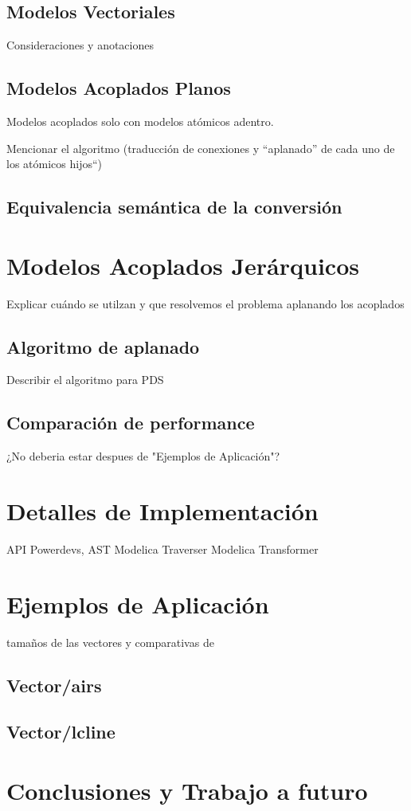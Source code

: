 \documentclass[a4paper,	11pt]{article}
\begin{document}
\subsection{Modelos Vectoriales}
Consideraciones  y anotaciones

\subsection{Modelos Acoplados Planos}
Modelos acoplados solo con modelos atómicos adentro.

Mencionar el algoritmo (traducción de conexiones y ``aplanado'' de cada uno de los atómicos hijos``)	

\subsection{Equivalencia semántica de la conversión}

\section{Modelos Acoplados Jerárquicos}
Explicar cuándo se utilzan y que resolvemos el problema aplanando los acoplados

\subsection{Algoritmo de aplanado}
Describir el algoritmo para PDS


\subsection{Comparación de performance}
¿No deberia estar despues de "Ejemplos de Aplicación"?

\section{Detalles de Implementación}
API Powerdevs, AST Modelica
Traverser
Modelica Transformer


\section{Ejemplos de Aplicación}
tamaños de las vectores y comparativas de 
\subsection{Vector/airs}
\subsection{Vector/lcline}

\section{Conclusiones y Trabajo a futuro}


\begin{small}

\end{small}
\end{document}
